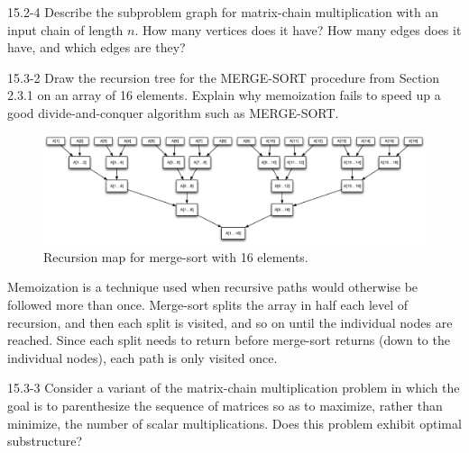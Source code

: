 \begin{problem}{15.2-4}
  Describe the subproblem graph for matrix-chain multiplication with an input chain of length $n$. How many vertices
  does it have? How many edges does it have, and which edges are they?
\end{problem}

\begin{problem}{15.3-2}
  Draw the recursion tree for the MERGE-SORT procedure from Section 2.3.1 on an array of 16 elements. Explain why
  memoization fails to speed up a good divide-and-conquer algorithm such as MERGE-SORT.
  \begin{solution}
    \begin{figure}[H]
      \centering
      \caption{Recursion map for merge-sort with 16 elements.}
      \includegraphics[scale=.35]{15_3_2.eps}
    \end{figure}
    Memoization is a technique used when recursive paths would otherwise be followed more than once. Merge-sort splits
    the array in half each level of recursion, and then each split is visited, and so on until the individual nodes are
    reached. Since each split needs to return before merge-sort returns (down to the individual nodes), each path is
    only visited once.
  \end{solution}
\end{problem}

\begin{problem}{15.3-3}
  Consider a variant of the matrix-chain multiplication problem in which the goal is to parenthesize the sequence of
  matrices so as to maximize, rather than minimize, the number of scalar multiplications. Does this problem exhibit
  optimal substructure?
\end{problem}


